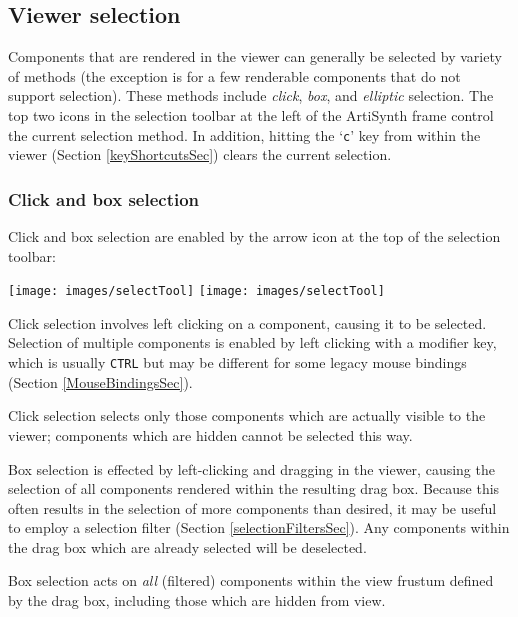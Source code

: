 \documentclass{article}
\begin{document}
\subsection{Viewer selection}
\label{viewerSelectionSec}

Components that are rendered in the viewer can generally be selected
by variety of methods (the exception is for a few renderable
components that do not support selection). These methods include {\it click},
{\it box}, and {\it elliptic} selection. The top two icons in the
selection toolbar at the left of the ArtiSynth frame control the
current selection method. In addition, hitting the `{\tt c}' key
from within the viewer
(Section \ref{keyShortcutsSec}) clears the current selection.

\subsubsection{Click and box selection}

Click and box selection are enabled by the arrow icon at the top of
the selection toolbar:

\vspace{\parskip}
\iflatexml
\texttt{[image: images/selectTool]}
\else
\texttt{[image: images/selectTool]}
\fi

Click selection involves left clicking on a component, causing it to
be selected. Selection of multiple components is enabled by left
clicking with a modifier key, which is usually {\tt CTRL}
but may be different for some legacy mouse bindings 
(Section \ref{MouseBindingsSec}).

\begin{sideblock}
Click selection selects only those components which are actually
visible to the viewer; components which are hidden cannot be selected
this way.
\end{sideblock}

Box selection is effected by left-clicking and dragging in the viewer,
causing the selection of all components rendered within the resulting
drag box. Because this often results in the selection of more
components than desired, it may be useful to employ a selection filter
(Section \ref{selectionFiltersSec}). Any components within the drag
box which are already selected will be deselected.

\begin{sideblock}
Box selection acts on {\it all} (filtered) components within the view
frustum defined by the drag box, including those which are hidden
from view.
\end{sideblock}
\end{document}
